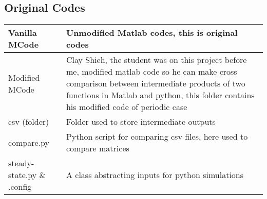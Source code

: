 \documentclass[letter,12pt]{article}
\begin{document}
\subsection{Original Codes}
\begin{table}[h]
\centering
\label{my-label}
{\renewcommand\arraystretch{1.25}
\begin{tabular}{|l|l|l|}
\hline
Vanilla MCode              & \multicolumn{2}{p{11cm}|}{Unmodified Matlab codes, this is original codes}                                                                                                                                                                                          \\ \hline
Modified MCode             & \multicolumn{2}{p{11cm}|}{\raggedright Clay Shieh, the student was on this project before me, modified matlab code so he can make cross comparison between intermediate products of two functions in Matlab and python, this folder contains his modified code of periodic case} \\ \hline
csv (folder)               & \multicolumn{2}{p{11cm}|}{\raggedright Folder used to store intermediate outputs}                                                                                                                                                                                                \\ \hline
compare.py                 & \multicolumn{2}{p{11cm}|}{\raggedright Python script for comparing csv files, here used to compare matrices}                                                                                                                                                                     \\ \hline
steady-state.py \& .config & \multicolumn{2}{p{11cm}|}{\raggedright A class abstracting inputs for python simulations}                                                                                                                                                                                        \\ \hline
\end{tabular}}
\end{table}
\pagebreak
\end{document}

